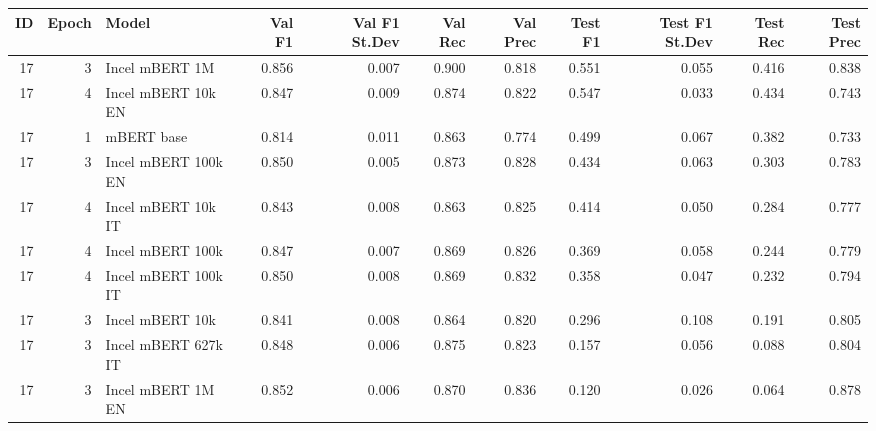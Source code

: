 \begin{tabular}{rrlrrrrrrrr}
\toprule
 ID &  Epoch &               Model &  Val F1 &  Val F1 St.Dev &  Val Rec &  Val Prec &  Test F1 &  Test F1 St.Dev &  Test Rec &  Test Prec \\
\midrule
 17 &      3 &      Incel mBERT 1M &   0.856 &          0.007 &    0.900 &     0.818 &    0.551 &           0.055 &     0.416 &      0.838 \\
 17 &      4 &  Incel mBERT 10k EN &   0.847 &          0.009 &    0.874 &     0.822 &    0.547 &           0.033 &     0.434 &      0.743 \\
 17 &      1 &          mBERT base &   0.814 &          0.011 &    0.863 &     0.774 &    0.499 &           0.067 &     0.382 &      0.733 \\
 17 &      3 & Incel mBERT 100k EN &   0.850 &          0.005 &    0.873 &     0.828 &    0.434 &           0.063 &     0.303 &      0.783 \\
 17 &      4 &  Incel mBERT 10k IT &   0.843 &          0.008 &    0.863 &     0.825 &    0.414 &           0.050 &     0.284 &      0.777 \\
 17 &      4 &    Incel mBERT 100k &   0.847 &          0.007 &    0.869 &     0.826 &    0.369 &           0.058 &     0.244 &      0.779 \\
 17 &      4 & Incel mBERT 100k IT &   0.850 &          0.008 &    0.869 &     0.832 &    0.358 &           0.047 &     0.232 &      0.794 \\
 17 &      3 &     Incel mBERT 10k &   0.841 &          0.008 &    0.864 &     0.820 &    0.296 &           0.108 &     0.191 &      0.805 \\
 17 &      3 & Incel mBERT 627k IT &   0.848 &          0.006 &    0.875 &     0.823 &    0.157 &           0.056 &     0.088 &      0.804 \\
 17 &      3 &   Incel mBERT 1M EN &   0.852 &          0.006 &    0.870 &     0.836 &    0.120 &           0.026 &     0.064 &      0.878 \\
\bottomrule
\end{tabular}
